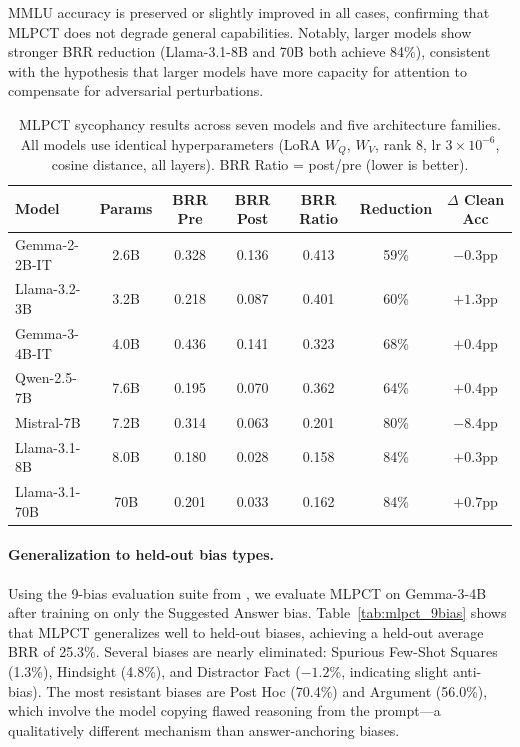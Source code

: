 MMLU accuracy is preserved or slightly improved in all cases, confirming that MLPCT does not degrade general capabilities. Notably, larger models show stronger BRR reduction (Llama-3.1-8B and 70B both achieve 84\%), consistent with the hypothesis that larger models have more capacity for attention to compensate for adversarial perturbations.

\begin{table}[t]
\centering
\caption{MLPCT sycophancy results across seven models and five architecture families. All models use identical hyperparameters (LoRA $W_Q$, $W_V$, rank 8, lr $3 \times 10^{-6}$, cosine distance, all layers). BRR Ratio = post/pre (lower is better).}
\label{tab:mlpct_crossmodel}
\small
\begin{tabular}{lcccccc}
\toprule
\textbf{Model} & \textbf{Params} & \textbf{BRR Pre} & \textbf{BRR Post} & \textbf{BRR Ratio} & \textbf{Reduction} & \textbf{$\Delta$ Clean Acc} \\
\midrule
Gemma-2-2B-IT & 2.6B & 0.328 & 0.136 & 0.413 & 59\% & $-0.3$pp \\
Llama-3.2-3B & 3.2B & 0.218 & 0.087 & 0.401 & 60\% & $+1.3$pp \\
Gemma-3-4B-IT & 4.0B & 0.436 & 0.141 & 0.323 & 68\% & $+0.4$pp \\
Qwen-2.5-7B & 7.6B & 0.195 & 0.070 & 0.362 & 64\% & $+0.4$pp \\
Mistral-7B & 7.2B & 0.314 & 0.063 & 0.201 & 80\% & $-8.4$pp \\
Llama-3.1-8B & 8.0B & 0.180 & 0.028 & 0.158 & 84\% & $+0.3$pp \\
Llama-3.1-70B & 70B & 0.201 & 0.033 & 0.162 & 84\% & $+0.7$pp \\
\bottomrule
\end{tabular}
\end{table}

\paragraph{Generalization to held-out bias types.} Using the 9-bias evaluation suite from \citet{chua2024bias}, we evaluate MLPCT on Gemma-3-4B after training on only the Suggested Answer bias. Table~\ref{tab:mlpct_9bias} shows that MLPCT generalizes well to held-out biases, achieving a held-out average BRR of 25.3\%. Several biases are nearly eliminated: Spurious Few-Shot Squares (1.3\%), Hindsight (4.8\%), and Distractor Fact ($-1.2$\%, indicating slight anti-bias). The most resistant biases are Post Hoc (70.4\%) and Argument (56.0\%), which involve the model copying flawed reasoning from the prompt---a qualitatively different mechanism than answer-anchoring biases.

